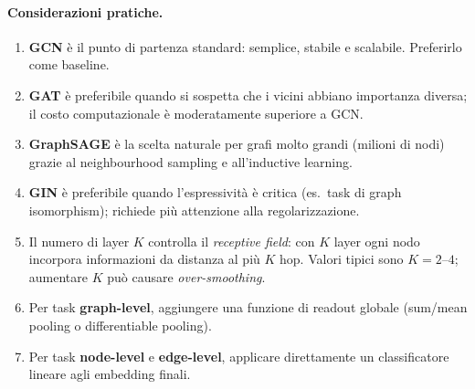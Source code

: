 \paragraph{Considerazioni pratiche.}
\begin{enumerate}
  \item \textbf{GCN} è il punto di partenza standard: semplice,
        stabile e scalabile. Preferirlo come baseline.
  \item \textbf{GAT} è preferibile quando si sospetta che i vicini
        abbiano importanza diversa; il costo computazionale è
        moderatamente superiore a GCN.
  \item \textbf{GraphSAGE} è la scelta naturale per grafi molto
        grandi (milioni di nodi) grazie al neighbourhood sampling
        e all'inductive learning.
  \item \textbf{GIN} è preferibile quando l'espressività è critica
        (es.\ task di graph isomorphism); richiede più attenzione
        alla regolarizzazione.
  \item Il numero di layer $K$ controlla il \emph{receptive field}:
        con $K$ layer ogni nodo incorpora informazioni da distanza
        al più $K$ hop. Valori tipici sono $K = 2$--$4$; aumentare
        $K$ può causare \emph{over-smoothing}.
  \item Per task \textbf{graph-level}, aggiungere una funzione di
        readout globale (sum/mean pooling o differentiable pooling).
  \item Per task \textbf{node-level} e \textbf{edge-level}, applicare
        direttamente un classificatore lineare agli embedding finali.
\end{enumerate}
